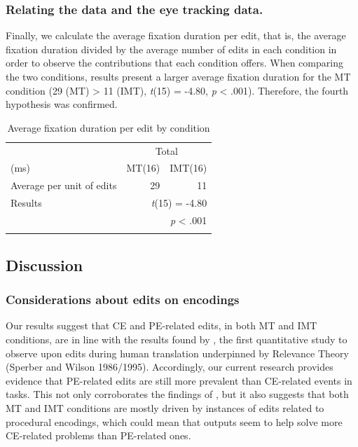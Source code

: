 \documentclass[output=paper]{langsci/langscibook}
\begin{document}
\subsubsection{Relating the  data and the eye tracking data.\label{alves:sec:RelatingTheEncodingData}}

Finally, we calculate the average fixation duration per edit, that is, the average fixation duration divided by the average number of edits in each condition in order to observe the contributions that each condition offers. When comparing the two conditions, results present a larger average fixation duration for the MT condition                 (29 (MT) {\textgreater} 11 (IMT), \textit{t}(15) = -4.80, \textit{p} < .001). Therefore, the fourth hypothesis was confirmed.

\begin{table}
\begin{tabular}{lrr}
\lsptoprule
 & \multicolumn{2}{c}{Total}\\
(ms) & {  MT(16)} &   IMT(16)\\
\midrule
Average per unit of edits & {29} & 11\\
Results & \multicolumn{2}{r}{\textit{t}(15) = -4.80}\\
& \multicolumn{2}{r}{ \textit{p} < .001}\\ 
\lspbottomrule
\end{tabular}
\caption{Average fixation duration per edit by condition}
\label{sarto:tab:5}
\end{table}

\subsection{Discussion\label{alves:sec:Discussion}}

\subsubsection{Considerations about edits on encodings\label{alves:sec:ConsiderationsAboutEditsOnEncodings}}

Our results suggest that CE and PE-related edits, in both MT and IMT conditions, are in line with the results found by \citet{alves2013}, the first quantitative study to observe  upon edits during human translation underpinned by Relevance Theory (Sperber and Wilson 1986/1995). Accordingly, our current research provides evidence that PE-related edits are still more prevalent than CE-related events in  tasks. This not only corroborates the findings of \citet{alves2013}, but it also suggests that both MT and IMT conditions are mostly driven by instances of edits related to procedural encodings, which could mean that  outputs seem to help solve more CE-related problems than PE-related ones.
\end{document}
